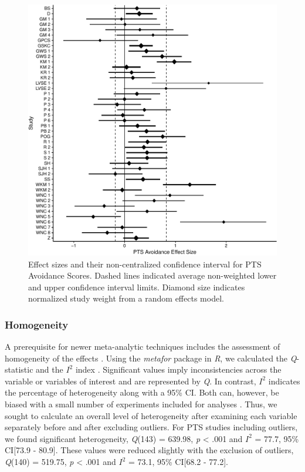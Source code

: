 \documentclass[english,man]{apa6}
\theoremstyle{definition}
\theoremstyle{definition}
\theoremstyle{definition}
\theoremstyle{remark}
\begin{document}
\begin{figure}
\centering
\includegraphics{meta_markdown_files/figure-latex/ptspicavoid-1.pdf}
\caption{\label{fig:ptspicavoid}Effect sizes and their non-centralized
confidence interval for PTS Avoidance Scores. Dashed lines indicated
average non-weighted lower and upper confidence interval limits. Diamond
size indicates normalized study weight from a random effects model.}
\end{figure}

\subsubsection{Homogeneity}\label{homogeneity}

A prerequisite for newer meta-analytic techniques includes the
assessment of homogeneity of the effects \autocite{VanAert2016}. Using
the \emph{metafor} package in \emph{R}, we calculated the
\emph{Q}-statistic and the \(I^2\) index
\autocites{Cochran1954}{Huedo-Medina2006}. Significant values imply
inconsistencies across the variable or variables of interest and are
represented by \emph{Q}. In contrast, \(I^2\) indicates the percentage
of heterogeneity along with a 95\% CI. Both can, however, be biased with
a small number of experiments included for analyses
\autocites{Higgins2003}{Huedo-Medina2006}. Thus, we sought to calculate
an overall level of heterogeneity after examining each variable
separately before and after excluding outliers. For PTS studies
including outliers, we found significant heterogeneity, \emph{Q}(143) =
639.98, \emph{p} \textless{} .001 and \(I^2\) = 77.7, 95\% CI{[}73.9 -
80.9{]}. These values were reduced slightly with the exclusion of
outliers, \emph{Q}(140) = 519.75, \emph{p} \textless{} .001 and \(I^2\)
= 73.1, 95\% CI{[}68.2 - 77.2{]}.
\end{document}
